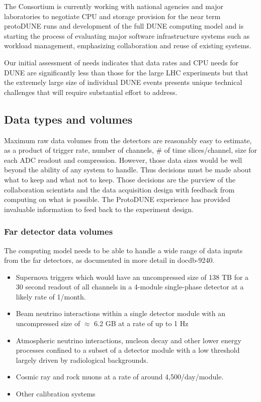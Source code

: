 The Consortium is currently working with national agencies and major laboratories to negotiate CPU and storage provision for the near term protoDUNE runs and development of the full DUNE computing model and is starting the process of evaluating major software infrastructure systems such as workload management, emphasizing collaboration and reuse of existing systems. 

Our initial assessment of needs indicates that data rates and CPU needs for DUNE are significantly less than those for the large LHC experiments but that the extremely large size of individual DUNE events presents unique technical challenges that will require substantial effort to address. 


\subsection{Data types and volumes}
Maximum raw data volumes from the detectors are reasonably easy to estimate, as a product of trigger rate, number of channels, \# of time slices/channel,  size for each ADC readout and compression. However, those data sizes would be well beyond the ability of any system to handle. Thus decisions must be made about what to keep and what not to keep. Those decisions are the purview of the collaboration scientists and the data acquisition design with feedback from computing on what is possible.  The ProtoDUNE experience has provided invaluable information to feed back to the experiment design. 




\subsubsection{Far detector data volumes}

The computing model needs to be able to handle a wide range of data inputs from the far detectors, as documented in more detail in docdb-9240.

\begin{itemize}
\item Supernova triggers which would have an uncompressed size of 138 TB for a 30 second readout of all channels in a 4-module single-phase detector at a likely rate of 1/month.  
\item Beam neutrino interactions within a single detector module with an uncompressed size of $\approx$ 6.2 GB at a rate of up to 1 Hz
\item Atmospheric neutrino interactions, nucleon decay and other lower energy processes confined to a subset of a detector module with a low threshold largely driven by radiological backgrounds.
\item Cosmic ray and rock muons at a rate of around 4,500/day/module.
\item Other calibration systems 
\end{itemize}

